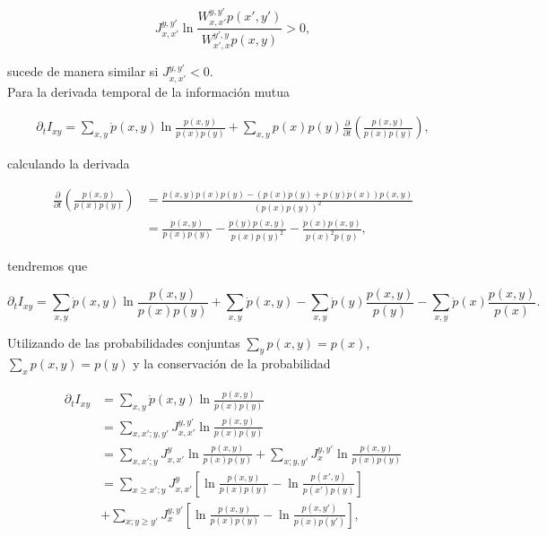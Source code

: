 \begin{appendixs}
\begin{equation*}
    J_{x,x'}^{y,y'} \ln \frac{ W_{x,x'}^{y,y'}p(x',y') }{ W_{x',x}^{y',y}p(x,y) } > 0,
\end{equation*}

sucede de manera similar si $J_{x,x'}^{y,y'}<0$.\\
 Para la derivada temporal de la información mutua 

\begin{align*}
    \partial_{t} I_{xy} = \sum_{x,y}\dot{p}(x,y) \ln \frac{p(x,y) }{ p(x)p(y) } + \sum_{x,y}p(x)p(y) \frac{\partial}{\partial t} \left( \frac{p(x,y)}{p(x)p(y)} \right),
 \end{align*}

calculando la derivada

\begin{align*}
    \frac{\partial }{\partial t} \left( \frac{p(x,y)}{p(x)p(y)} \right) & = \frac{ \dot{p}(x,y)p(x)p(y) - (p(x)\dot{p}(y) + p(y)\dot{p}(x))p(x,y)   }{ (p(x)p(y))^{2} } \\
    & = \frac{\dot{p}(x,y)}{p(x)p(y) } - \frac{\dot{p}(y)p(x,y)  }{ p(x)p(y)^{2} } - \frac{\dot{p}(x)p(x,y)  }{ p(x)^{2}p(y) },  
\end{align*}

tendremos que

\begin{equation*}
    \partial_{t}I_{xy} = \sum_{x,y}\dot{p}(x,y) \ln \frac{p(x,y)}{ p(x)p(y) } + \sum_{x,y} \dot{p}(x,y) - \sum_{x,y} \dot{p}(y) \frac{p(x,y)}{p(y)} - \sum_{x,y} \dot{p}(x) \frac{p(x,y)}{p(x)}. 
\end{equation*}

Utilizando de las probabilidades conjuntas $\sum_{y}p(x,y) = p(x)$, $\sum_{x}p(x,y)  = p(y)$ y la conservación de la probabilidad

\begin{align*}
    \partial_{t}I_{xy} & = \sum_{x,y}\dot{p}(x,y) \ln \frac{p(x,y)}{ p(x)p(y) } \\
    & = \sum_{x,x';y,y'}J_{x,x'}^{y,y'} \ln \frac{p(x,y)}{ p(x)p(y) } \\
    & = \sum_{x,x';y}J_{x,x'}^{y} \ln \frac{p(x,y)}{p(x)p(y)} + \sum_{x;y,y'}J_{x}^{y,y'} \ln \frac{p(x,y)}{p(x)p(y)} \\
    & = \sum_{x\geq x';y}J_{x,x'}^{y} \left[ \ln \frac{p(x,y)}{p(x)p(y)} - \ln \frac{p(x',y)}{p(x')p(y)}  \right] \\
    & + \sum_{x;y\geq y'} J_{x}^{y,y'} \left[ \ln \frac{p(x,y)}{p(x)p(y)} - \ln \frac{p(x,y')}{p(x)p(y')} \right],
\end{align*}


\end{appendixs}
